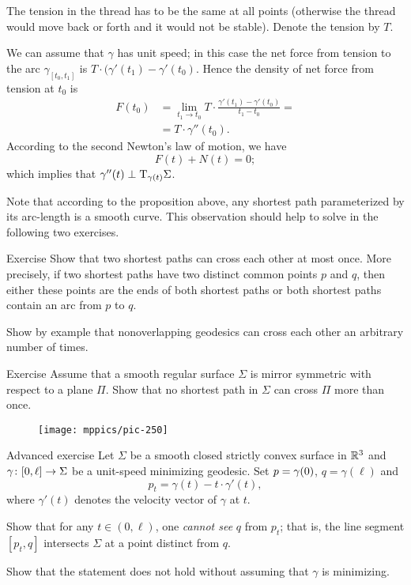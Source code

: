 The tension in the thread has to be the same at all points (otherwise the thread would move back or forth and it would not be stable).
Denote  the tension by $T$.

We can assume that $\gamma$ has unit speed;
in this case the net force from tension to the arc $\gamma_{[t_0,t_1]}$ is $T\cdot(\gamma'(t_1)-\gamma'(t_0)$.
Hence the density of net force from tension at $t_0$ is 
\begin{align*}
F(t_0)&=\lim_{t_1\to t_0}T\cdot\frac{\gamma'(t_1)-\gamma'(t_0)}{t_1-t_0}=
\\
&=T\cdot\gamma''(t_0).
\end{align*}
According to the second Newton's law of motion, we have 
\[F(t)+N(t)=0;\]
which implies that  $\gamma''(t)\perp\mathrm{T}_{\gamma(t)}\Sigma$.
\qeds

Note that according to the proposition above, any shortest path parameterized by its arc-length is a smooth curve.
This observation should help to solve in the following two exercises.

\begin{thm}{Exercise}\label{ex:two-min-geod}
Show that two shortest paths can cross each other at most once.
More precisely, if two shortest paths have two distinct common points $p$ and $q$, then either these points are the ends of both shortest paths or both shortest paths contain an arc from $p$ to $q$.

Show by example that nonoverlapping geodesics can cross each other an arbitrary number of times.
\end{thm}

\begin{thm}{Exercise}\label{ex:min-geod+plane}
Assume that a smooth regular surface $\Sigma$ is mirror symmetric with respect to a plane $\Pi$.
Show that no shortest path in $\Sigma$ can cross $\Pi$ more than once.
\end{thm}

{

\begin{wrapfigure}{r}{48 mm}
\vskip-4mm
\centering
\texttt{[image: mppics/pic-250]}
\vskip-0mm
\end{wrapfigure}

\begin{thm}{Advanced exercise}\label{ex:milka}
Let $\Sigma$ be a smooth closed strictly convex surface 
in $\mathbb{R}^3$ 
and $\gamma\:[0,\ell]\z\to \Sigma$ be a unit-speed minimizing geodesic.
Set $p\z=\gamma(0)$, $q=\gamma(\ell)$ and 
$$p_t=\gamma(t)-t\cdot\gamma'(t),$$ 
where $\gamma'(t)$ denotes the velocity vector of $\gamma$ at $t$.

Show that for any $t\in (0,\ell)$,
one {}\emph{cannot see}  $q$ from $p_t$;
that is, the line segment $[p_t,q]$ intersects $\Sigma$ at a point distinct from $q$.

Show that the statement does not hold without assuming that $\gamma$ is minimizing.
\end{thm}

}

